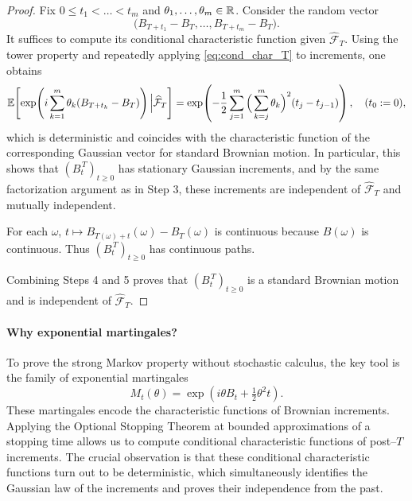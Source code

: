 \begin{proof}
\medskip
{}

Fix $0\le t_1<\dots<t_m$ and $\theta_1,\dots,\theta_m\in\mathbb{R}$.
Consider the random vector
\[
\bigl(B_{T+t_1}-B_T,\dots,B_{T+t_m}-B_T\bigr).
\]
It suffices to compute its conditional characteristic function given $\widehat{\mathcal F}_T$.
Using the tower property and repeatedly applying \eqref{eq:cond_char_T} to increments,
one obtains
\[
\mathbb{E}\!\left[\exp\!\left(i\sum_{k=1}^m \theta_k(B_{T+t_k}-B_T)\right)\Big|\widehat{\mathcal F}_T\right]
=
\exp\!\left(-\frac12\sum_{j=1}^m \Big(\sum_{k=j}^m\theta_k\Big)^2 (t_j-t_{j-1})\right),
\quad (t_0:=0),
\]
which is deterministic and coincides with the characteristic function of the corresponding Gaussian
vector for standard Brownian motion. In particular, this shows that $(B_t^{\,T})_{t\ge0}$
has stationary Gaussian increments, and by the same factorization argument as in Step 3,
these increments are independent of $\widehat{\mathcal F}_T$ and mutually independent.

\medskip
{}

For each $\omega$, $t\mapsto B_{T(\omega)+t}(\omega)-B_T(\omega)$ is continuous because $B(\omega)$ is continuous.
Thus $(B_t^{\,T})_{t\ge0}$ has continuous paths.

Combining Steps 4 and 5 proves that $(B_t^{\,T})_{t\ge0}$ is a standard Brownian motion and is independent of
$\widehat{\mathcal F}_T$.
\end{proof}

\medskip
\paragraph{Why exponential martingales?}
To prove the strong Markov property without stochastic calculus, the key tool is the family of
exponential martingales
\[
M_t(\theta)=\exp\!\left(i\theta B_t+\tfrac12\theta^2 t\right).
\]
These martingales encode the characteristic functions of Brownian increments.
Applying the Optional Stopping Theorem at bounded approximations of a stopping time allows us
to compute conditional characteristic functions of post--$T$ increments.
The crucial observation is that these conditional characteristic functions turn out to be
deterministic, which simultaneously identifies the Gaussian law of the increments and proves
their independence from the past.

